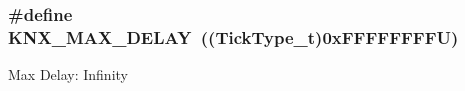 \subsubsection[{\texorpdfstring{K\+N\+X\+\_\+\+M\+A\+X\+\_\+\+D\+E\+L\+AY}{KNX_MAX_DELAY}}]{\setlength{\rightskip}{0pt plus 5cm}\#define K\+N\+X\+\_\+\+M\+A\+X\+\_\+\+D\+E\+L\+AY~((Tick\+Type\+\_\+t)0x\+F\+F\+F\+F\+F\+F\+F\+F\+U)}\hypertarget{group___k_n_x___timeout_ga8e1f26f2f54559b80991272e3b5e13e8}{}\label{group___k_n_x___timeout_ga8e1f26f2f54559b80991272e3b5e13e8}
Max Delay\+: Infinity 